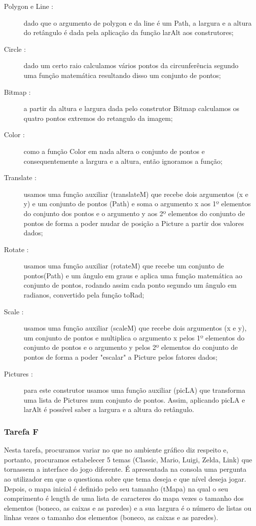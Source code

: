 \documentclass[a4paper]{article}
\begin{document}
\begin{description}
  \item[Polygon e Line :] dado que o argumento de polygon e da line é um Path, a largura e a altura do retângulo é dada pela aplicação da função larAlt aos construtores;
  \item[Circle :] dado um certo raio calculamos vários pontos da circunferência segundo uma função matemática resultando disso um conjunto de pontos;
  \item[Bitmap :] a partir da altura e largura dada pelo construtor Bitmap calculamos os quatro pontos extremos do retangulo da imagem;
  \item[Color :] como a função Color em nada altera o conjunto de pontos e consequentemente a largura e a altura, então ignoramos a função;
  \item[Translate :] usamos uma função auxiliar (translateM) que recebe dois argumentos (x e y) e um conjunto de pontos (Path) e soma o argumento x aos 1º elementos do conjunto dos pontos e o argumento y aos 2º elementos do conjunto de pontos de forma a poder mudar de posição a Picture a partir dos valores dados;
  \item[Rotate :] usamos uma função auxiliar  (rotateM) que recebe um conjunto de pontos(Path) e um ângulo em graus e aplica uma função matemática ao conjunto de pontos, rodando assim cada ponto segundo um ângulo em radianos, convertido pela função toRad;
  \item[Scale :] usamos uma função auxiliar (scaleM) que recebe dois argumentos (x e y), um conjunto de pontos e multiplica o argumento x pelos 1º elementos do conjunto de pontos e o argumento y pelos 2º elementos do conjunto de pontos de forma a poder "escalar" a Picture pelos fatores dados;
  \item[Pictures :] para este construtor usamos uma função auxiliar (picLA) que transforma uma lista de Pictures num conjunto de pontos. Assim, aplicando picLA e larAlt é possível saber a largura e a altura do retângulo.
\end{description}



\subsubsection{Tarefa F}
Nesta tarefa, procuramos variar no que no ambiente gráfico diz respeito e, portanto, procuramos estabelecer 5 temas (Classic, Mario, Luigi, Zelda, Link) que tornassem a interface do jogo diferente. É apresentada na consola uma pergunta ao utilizador em que o questiona sobre que tema deseja e que nível deseja jogar.
Depois, o mapa inicial é definido pelo seu tamanho (tMapa) na qual o seu comprimento é length de uma lista de caracteres do mapa vezes o tamanho dos elementos (boneco, as caixas e as paredes) e a sua largura é o número de listas ou linhas vezes o tamanho dos elementos (boneco, as caixas e as paredes).
\end{document}
